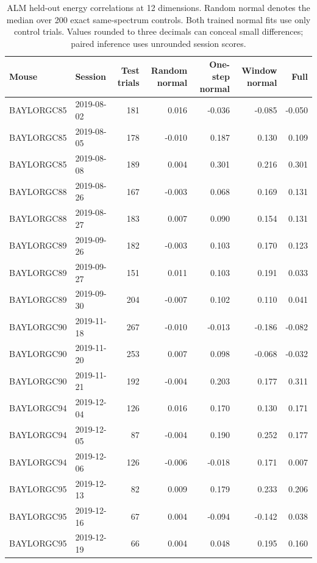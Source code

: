 \documentclass[aps,10pt,onecolumn,superscriptaddress,nofootinbib,
  longbibliography,amsmath,amssymb,floatfix]{revtex4-2}
\begin{document}
\begin{table}[ht]
\caption{\label{tab:alm}ALM held-out energy correlations at 12 dimensions.
Random normal denotes the median over 200 exact same-spectrum controls.
Both trained normal fits use only control trials. Values rounded to
three decimals can conceal small differences; paired inference uses
unrounded session scores.}
\begin{ruledtabular}
\begin{tabular}{llrrrrr}
Mouse & Session & Test trials & Random normal & One-step normal &
Window normal & Full\\
\hline
BAYLORGC85 & 2019-08-02 & 181 & 0.016 & -0.036 & -0.085 & -0.050\\
BAYLORGC85 & 2019-08-05 & 178 & -0.010 & 0.187 & 0.130 & 0.109\\
BAYLORGC85 & 2019-08-08 & 189 & 0.004 & 0.301 & 0.216 & 0.301\\
BAYLORGC88 & 2019-08-26 & 167 & -0.003 & 0.068 & 0.169 & 0.131\\
BAYLORGC88 & 2019-08-27 & 183 & 0.007 & 0.090 & 0.154 & 0.131\\
BAYLORGC89 & 2019-09-26 & 182 & -0.003 & 0.103 & 0.170 & 0.123\\
BAYLORGC89 & 2019-09-27 & 151 & 0.011 & 0.103 & 0.191 & 0.033\\
BAYLORGC89 & 2019-09-30 & 204 & -0.007 & 0.102 & 0.110 & 0.041\\
BAYLORGC90 & 2019-11-18 & 267 & -0.010 & -0.013 & -0.186 & -0.082\\
BAYLORGC90 & 2019-11-20 & 253 & 0.007 & 0.098 & -0.068 & -0.032\\
BAYLORGC90 & 2019-11-21 & 192 & -0.004 & 0.203 & 0.177 & 0.311\\
BAYLORGC94 & 2019-12-04 & 126 & 0.016 & 0.170 & 0.130 & 0.171\\
BAYLORGC94 & 2019-12-05 & 87 & -0.004 & 0.190 & 0.252 & 0.177\\
BAYLORGC94 & 2019-12-06 & 126 & -0.006 & -0.018 & 0.171 & 0.007\\
BAYLORGC95 & 2019-12-13 & 82 & 0.009 & 0.179 & 0.233 & 0.206\\
BAYLORGC95 & 2019-12-16 & 67 & 0.004 & -0.094 & -0.142 & 0.038\\
BAYLORGC95 & 2019-12-19 & 66 & 0.004 & 0.048 & 0.195 & 0.160\\
\end{tabular}
\end{ruledtabular}
\end{table}
\end{document}
